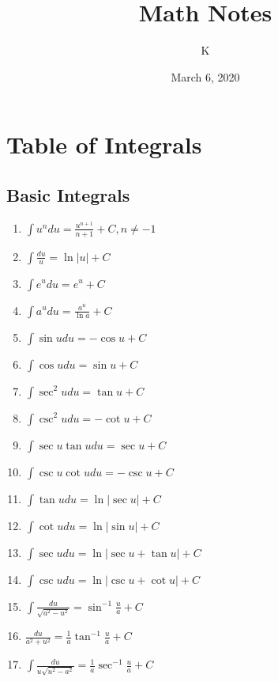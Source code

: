 \documentclass[12pt, letterpaper]{article}
\title{Math Notes}
\author{K}
\date{March 6, 2020}
\begin{document}
\begin{comment}
\begin{titlepage}
    \maketitle
\end{titlepage}
\end{comment}

\maketitle

\tableofcontents{}
\pagebreak

\section{Table of Integrals}
\subsection{Basic Integrals}
\begin{enumerate}
  \item $\int \limits u^n du = \frac{u^{n+1}}{n+1} + C, n \neq -1$
  \item $\int \limits \frac{du}{u} = \ln|u| + C$
  \item $\int \limits e^u du = e^u + C$
  \item $\int \limits a^u du = \frac{a^u}{\ln a} + C$
  \item $\int \limits \sin u du = -\cos u + C$
  \item $\int \limits \cos u du = \sin u + C$
  \item $\int \limits \sec^2 u du = \tan u + C$
  \item $\int \limits \csc^2 u du = -\cot u + C$
  \item $\int \limits \sec u \tan u du = \sec u + C$
  \item $\int \limits \csc u \cot u du = -\csc u + C$
  \item $\int \limits \tan u du = \ln |\sec u| + C$
  \item $\int \limits \cot u du = \ln |\sin u| + C$
  \item $\int \limits \sec u du = \ln |\sec u + \tan u| + C$
  \item $\int \limits \csc u du = \ln |\csc u + \cot u| + C$
  \item $\int \limits \frac{du}{\sqrt{a^2-u^2}} = \sin^{-1} \frac{u}{a} + C$
  \item $\frac{du}{a^2 + u^2} = \frac{1}{a}\tan^{-1}\frac{u}{a} + C$
  \item $\int \limits \frac{du}{u\sqrt{u^2 - a^2}} = \frac{1}{a} \sec^{-1}\frac{u}{a} + C$
\end{enumerate}
\end{document}
